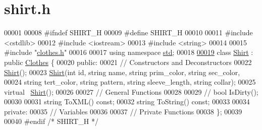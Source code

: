 \hypertarget{shirt_8h_source}{}\section{shirt.\+h}

\begin{DoxyCode}
00001 
00008 \textcolor{preprocessor}{#ifndef SHIRT\_H}
00009 \textcolor{preprocessor}{#define SHIRT\_H}
00010 
00011 \textcolor{preprocessor}{#include <cstdlib>}
00012 \textcolor{preprocessor}{#include <iostream>}
00013 \textcolor{preprocessor}{#include <string>}
00014 
00015 \textcolor{preprocessor}{#include "\mbox{\hyperlink{clothes_8h}{clothes.h}}"}
00016 
00017 \textcolor{keyword}{using namespace }\mbox{\hyperlink{namespacestd}{std}};
00018 
\mbox{\hyperlink{classShirt}{00019}} \textcolor{keyword}{class }\mbox{\hyperlink{classShirt}{Shirt}} : \textcolor{keyword}{public} \mbox{\hyperlink{classClothes}{Clothes}} \{
00020  \textcolor{keyword}{public}:
00021   \textcolor{comment}{// Constructors and Deconstructors}
00022   \mbox{\hyperlink{classShirt}{Shirt}}();
00023   \mbox{\hyperlink{classShirt}{Shirt}}(\textcolor{keywordtype}{int} \textcolor{keywordtype}{id}, \textcolor{keywordtype}{string} name, \textcolor{keywordtype}{string} prim\_color, \textcolor{keywordtype}{string} sec\_color,
00024         \textcolor{keywordtype}{string} tert\_color, \textcolor{keywordtype}{string} pattern, \textcolor{keywordtype}{string} sleeve\_length, \textcolor{keywordtype}{string} collar);
00025   \textcolor{keyword}{virtual} ~\mbox{\hyperlink{classShirt}{Shirt}}();
00026 
00027   \textcolor{comment}{// General Functions}
00028 
00029   \textcolor{comment}{// bool IsDirty();}
00030 
00031   \textcolor{keywordtype}{string} ToXML() \textcolor{keyword}{const};
00032   \textcolor{keywordtype}{string} ToString() \textcolor{keyword}{const};
00033 
00034  \textcolor{keyword}{private}:
00035   \textcolor{comment}{// Variables}
00036 
00037   \textcolor{comment}{// Private Functions}
00038 \};
00039 
00040 \textcolor{preprocessor}{#endif }\textcolor{comment}{/* SHIRT\_H */}\textcolor{preprocessor}{}
\end{DoxyCode}
